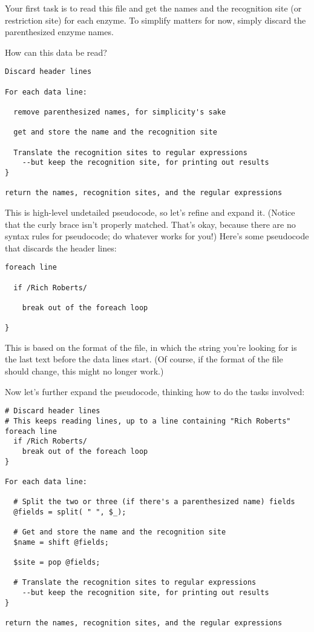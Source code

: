 Your first task is to read this file and get the names and the recognition site (or restriction site) for each enzyme. To simplify matters for now, simply discard the parenthesized enzyme names.

How can this data be read?

\begin{lstlisting}
Discard header lines 

For each data line:

  remove parenthesized names, for simplicity's sake

  get and store the name and the recognition site

  Translate the recognition sites to regular expressions
    --but keep the recognition site, for printing out results
}

return the names, recognition sites, and the regular expressions
\end{lstlisting}

This is high-level undetailed pseudocode, so let's refine and expand it. (Notice that the curly brace isn't properly matched. That's okay, because there are no syntax rules for pseudocode; do whatever works for you!) Here's some pseudocode that discards the header lines: 

\begin{lstlisting}
foreach line 

  if /Rich Roberts/ 

    break out of the foreach loop

}
\end{lstlisting}

This is based on the format of the file, in which the string you're looking for is the last text before the data lines start. (Of course, if the format of the file should change, this might no longer work.)

Now let's further expand the pseudocode, thinking how to do the tasks involved: 

\begin{lstlisting}
# Discard header lines
# This keeps reading lines, up to a line containing "Rich Roberts"
foreach line 
  if /Rich Roberts/ 
    break out of the foreach loop
}

For each data line:

  # Split the two or three (if there's a parenthesized name) fields
  @fields = split( " ", $_);

  # Get and store the name and the recognition site
  $name = shift @fields;

  $site = pop @fields;

  # Translate the recognition sites to regular expressions
    --but keep the recognition site, for printing out results
}

return the names, recognition sites, and the regular expressions
\end{lstlisting}


